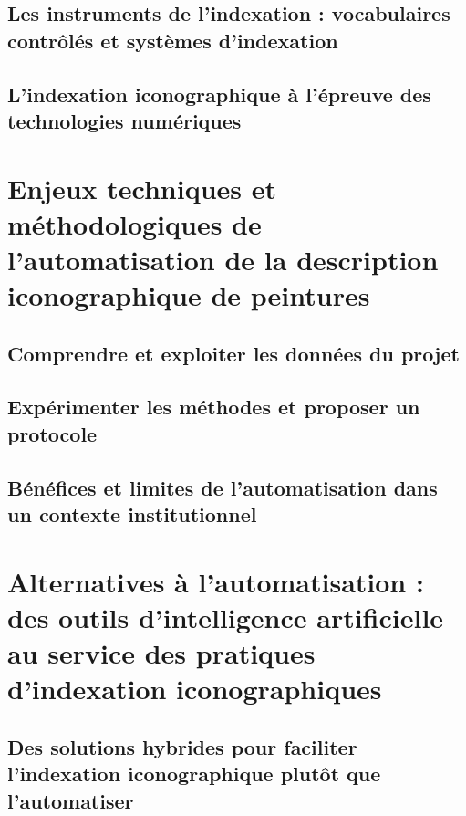 \documentclass[12pt,twoside]{book}
\begin{document}
\chapter[Les instruments de l'indexation]{Les instruments de l'indexation : vocabulaires contrôlés et systèmes d’indexation}


\chapter[Indexation et numérique]{L’indexation iconographique à l’épreuve des technologies numériques}


	\part{Enjeux techniques et méthodologiques de l’automatisation de la description iconographique de peintures}

\chapter[Les données du projet]{Comprendre et exploiter les données du projet}


\chapter[Expérimentations pour l'automatisation]{Expérimenter les méthodes et proposer un protocole}


\chapter[Bénéfices et limites de l'automatisation]{Bénéfices et limites de l’automatisation dans un contexte institutionnel}


	\part{Alternatives à l’automatisation : des outils d'intelligence artificielle au service des pratiques d'indexation iconographiques}

\chapter[Faciliter l'indexation]{Des solutions hybrides pour faciliter l’indexation iconographique plutôt que l’automatiser}

\end{document}
